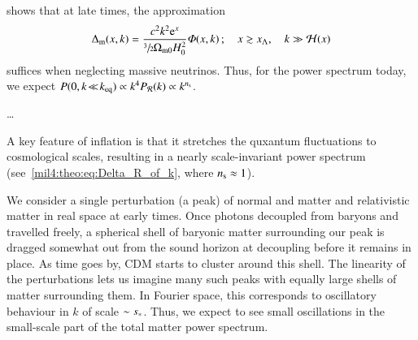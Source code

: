     \citet{DodelsonBook} shows that at late times, the approximation
    \begin{equation}\label{mil4:theo:eq:dimless_matter_power_spectrum}
        \Delta\ped{m}(x,k) = \frac{c^2k^2 \eu[x]}{\sfrac{3}{2} \OmgM H_0^2 } \Phi(x,k)\,; \quad x \gtrsim x\ped{\Lambda} ,\quad  k \gg \Hp(x)
    \end{equation}
    suffices when neglecting massive neutrinos. Thus, for the power spectrum today, we expect $P(0,k\!\ll\!k_\mathrm{eq}) \propto k^4P_\mathcal{R}(k) \propto k^{n_\mathrm{s}}$. 

    \dots

    A key feature of inflation is that it stretches the quxantum fluctuations to cosmological scales, resulting in a nearly scale-invariant power spectrum (see~\cref{mil4:theo:eq:Delta_R_of_k}, where $n_\mathrm{s}\approx 1$). 

    We consider a single perturbation (a peak) of normal and matter and relativistic matter in real space at early times. Once photons decoupled from baryons and travelled freely, a spherical shell of baryonic matter surrounding our peak is dragged somewhat out from the sound horizon at decoupling before it remains in place. As time goes by, CDM starts to cluster around this shell. The linearity of the perturbations lets us imagine many such peaks with equally large shells of matter surrounding them. In Fourier space, this corresponds to oscillatory behaviour in $k$ of scale $\sim s_*$. Thus, we expect to see small oscillations in the small-scale part of the total matter power spectrum.



    
    




    